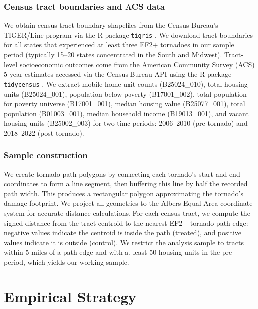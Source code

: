 \documentclass[12pt]{article}
\begin{document}
\subsubsection*{Census tract boundaries and ACS data} We obtain census tract boundary shapefiles from the Census Bureau's TIGER/Line program via the R package \texttt{tigris} \citep{walker2022tigris}. We download tract boundaries for all states that experienced at least three EF2+ tornadoes in our sample period (typically 15--20 states concentrated in the South and Midwest). Tract-level socioeconomic outcomes come from the American Community Survey (ACS) 5-year estimates accessed via the Census Bureau API using the R package \texttt{tidycensus} \citep{walker2022tidycensus}. We extract mobile home unit counts (B25024\_010), total housing units (B25024\_001), population below poverty (B17001\_002), total population for poverty universe (B17001\_001), median housing value (B25077\_001), total population (B01003\_001), median household income (B19013\_001), and vacant housing units (B25002\_003) for two time periods: 2006--2010 (pre-tornado) and 2018--2022 (post-tornado).

\subsubsection*{Sample construction} We create tornado path polygons by connecting each tornado's start and end coordinates to form a line segment, then buffering this line by half the recorded path width. This produces a rectangular polygon approximating the tornado's damage footprint. We project all geometries to the Albers Equal Area coordinate system for accurate distance calculations. For each census tract, we compute the signed distance from the tract centroid to the nearest EF2+ tornado path edge: negative values indicate the centroid is inside the path (treated), and positive values indicate it is outside (control). We restrict the analysis sample to tracts within 5 miles of a path edge and with at least 50 housing units in the pre-period, which yields our working sample.



\section{Empirical Strategy}
\label{sec:strategy}
\end{document}
